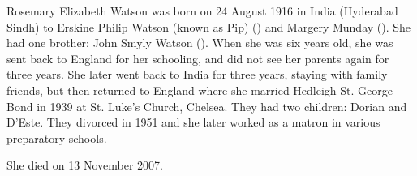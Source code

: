 
Rosemary Elizabeth Watson was born on	24 August 1916 in India (Hyderabad Sindh) to Erskine Philip Watson (known as Pip) () and Margery Munday (). She had one brother:  John Smyly Watson (). When she was six years old, she was sent back to England for her schooling, and did not see her parents again for three years. She later went back to India for three years, staying with family friends, but then returned to England where she married Hedleigh St. George Bond in 1939 at St. Luke's Church, Chelsea. They had two children: Dorian and D'Este. They divorced in 1951 and she later worked as a matron in various preparatory schools.

She died on 13 November 2007.
